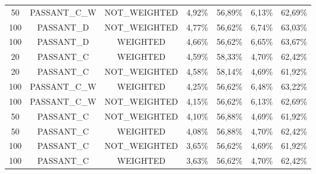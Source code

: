 \begin{table}[H]
{\begin{tabular}{ccccccc}
	50 & PASSANT\_C\_W & NOT\_WEIGHTED &     4,92\% &    56,89\% &     6,13\% &    62,69\% \\
	
	100 &  PASSANT\_D & NOT\_WEIGHTED &     4,77\% &    56,62\% &     6,74\% &    63,03\% \\
	
	100 &  PASSANT\_D &   WEIGHTED &     4,66\% &    56,62\% &     6,65\% &    63,67\% \\
	
	20 &  PASSANT\_C &   WEIGHTED &     4,59\% &    58,33\% &     4,70\% &    62,42\% \\
	
	20 &  PASSANT\_C & NOT\_WEIGHTED &     4,58\% &    58,14\% &     4,69\% &    61,92\% \\
	
	100 & PASSANT\_C\_W &   WEIGHTED &     4,25\% &    56,62\% &     6,48\% &    63,22\% \\
	
	100 & PASSANT\_C\_W & NOT\_WEIGHTED &     4,15\% &    56,62\% &     6,13\% &    62,69\% \\
	
	50 &  PASSANT\_C & NOT\_WEIGHTED &     4,10\% &    56,88\% &     4,69\% &    61,92\% \\
	
	50 &  PASSANT\_C &   WEIGHTED &     4,08\% &    56,88\% &     4,70\% &    62,42\% \\
	
	100 &  PASSANT\_C & NOT\_WEIGHTED &     3,65\% &    56,62\% &     4,69\% &    61,92\% \\
	
	100 &  PASSANT\_C &   WEIGHTED &     3,63\% &    56,62\% &     4,70\% &    62,42\% \\
	
	\end{tabular}  	
}
\end{table}

